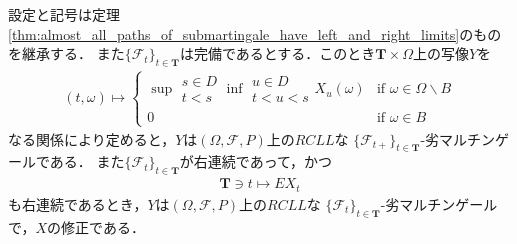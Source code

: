 	\begin{screen}
		\begin{thm}
		\label{thm:right_limit_process_is_a_RCLL_submartingale}
			設定と記号は定理\ref{thm:almost_all_paths_of_submartingale_have_left_and_right_limits}のものを継承する．
			また$\{\mathscr{F}_t\}_{t \in \mathbf{T}}$は完備であるとする．このとき$\mathbf{T} \times \Omega$上の写像$Y$を
			\begin{align}
				(t,\omega) \longmapsto 
				\begin{cases}
					\displaystyle \sup{\substack{s \in D \\ t < s}}{\inf{\substack{u \in D \\ t < u < s}}{X_u(\omega)}} 
					& \mbox{if } \omega \in \Omega \backslash B \\
					0 & \mbox{if } \omega \in B
				\end{cases}
			\end{align}
			なる関係により定めると，$Y$は$(\Omega,\mathscr{F},P)$上の$RCLL$な
			$\{\mathscr{F}_{t+}\}_{t \in \mathbf{T}}$-劣マルチンゲールである．
			また$\{\mathscr{F}_t\}_{t \in \mathbf{T}}$が右連続であって，かつ
			\begin{align}
				\mathbf{T} \ni t \longmapsto EX_t
			\end{align}
			も右連続であるとき，$Y$は$(\Omega,\mathscr{F},P)$上の$RCLL$な
			$\{\mathscr{F}_t\}_{t \in \mathbf{T}}$-劣マルチンゲールで，$X$の修正である．
		\end{thm}
	\end{screen}
	
